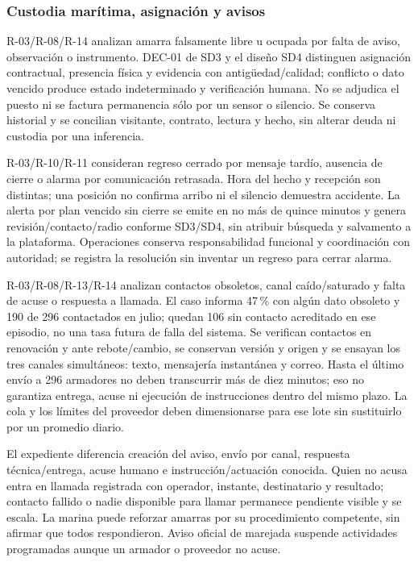 
\subsubsection{Custodia marítima, asignación y avisos}
R-03/R-08/R-14 analizan amarra falsamente libre u ocupada por falta de aviso, observación o instrumento. DEC-01 de SD3 y el diseño SD4 distinguen asignación contractual, presencia física y evidencia con antigüedad/calidad; conflicto o dato vencido produce estado indeterminado y verificación humana. No se adjudica el puesto ni se factura permanencia sólo por un sensor o silencio. Se conserva historial y se concilian visitante, contrato, lectura y hecho, sin alterar deuda ni custodia por una inferencia.

R-03/R-10/R-11 consideran regreso cerrado por mensaje tardío, ausencia de cierre o alarma por comunicación retrasada. Hora del hecho y recepción son distintas; una posición no confirma arribo ni el silencio demuestra accidente. La alerta por plan vencido sin cierre se emite en no más de quince minutos y genera revisión/contacto/radio conforme SD3/SD4, sin atribuir búsqueda y salvamento a la plataforma. Operaciones conserva responsabilidad funcional y coordinación con autoridad; se registra la resolución sin inventar un regreso para cerrar alarma. \parencite[decisión 4; numeral 17.4; RT-09.01]{sd8-c07}

R-03/R-08/R-13/R-14 analizan contactos obsoletos, canal caído/saturado y falta de acuse o respuesta a llamada. El caso informa 47\,\% con algún dato obsoleto y 190 de 296 contactados en julio; quedan 106 sin contacto acreditado en ese episodio, no una tasa futura de falla del sistema. Se verifican contactos en renovación y ante rebote/cambio, se conservan versión y origen y se ensayan los tres canales simultáneos: texto, mensajería instantánea y correo. Hasta el último envío a 296 armadores no deben transcurrir más de diez minutos; eso no garantiza entrega, acuse ni ejecución de instrucciones dentro del mismo plazo. La cola y los límites del proveedor deben dimensionarse para ese lote sin sustituirlo por un promedio diario.

El expediente diferencia creación del aviso, envío por canal, respuesta técnica/entrega, acuse humano e instrucción/actuación conocida. Quien no acusa entra en llamada registrada con operador, instante, destinatario y resultado; contacto fallido o nadie disponible para llamar permanece pendiente visible y se escala. La marina puede reforzar amarras por su procedimiento competente, sin afirmar que todos respondieron. Aviso oficial de marejada suspende actividades programadas aunque un armador o proveedor no acuse. \parencite[numerales 7.2 y 9.2; RT-09.01/RT-16.21; capítulo 18, criterio 4]{sd8-c07}


